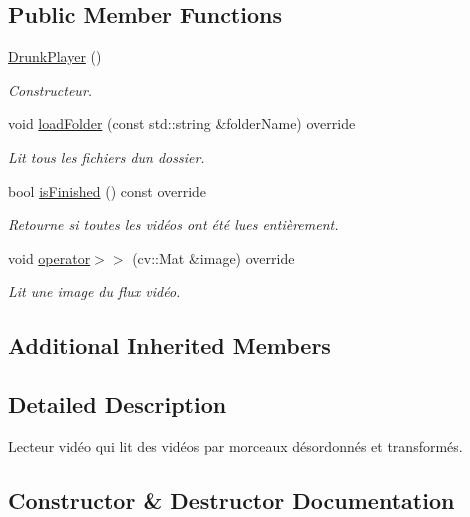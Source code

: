 \subsection*{Public Member Functions}
\begin{DoxyCompactItemize}
\item 
\hyperlink{classDrunkPlayer_a39c64a774a19456f3a4c194ec5e1131f}{Drunk\+Player} ()
\begin{DoxyCompactList}\small\item\em Constructeur. \end{DoxyCompactList}\item 
void \hyperlink{classDrunkPlayer_a235e60ea8a97c4d26277b066c2cebe80}{load\+Folder} (const std\+::string \&folder\+Name) override
\begin{DoxyCompactList}\small\item\em Lit tous les fichiers d\textquotesingle{}un dossier. \end{DoxyCompactList}\item 
bool \hyperlink{classDrunkPlayer_a9c032dda7df01fafc757fb1f4e265bb4}{is\+Finished} () const override
\begin{DoxyCompactList}\small\item\em Retourne si toutes les vidéos ont été lues entièrement. \end{DoxyCompactList}\item 
void \hyperlink{classDrunkPlayer_a2662f5010e15c95ca6639f56f012aed1}{operator$>$$>$} (cv\+::\+Mat \&image) override
\begin{DoxyCompactList}\small\item\em Lit une image du flux vidéo. \end{DoxyCompactList}\end{DoxyCompactItemize}
\subsection*{Additional Inherited Members}


\subsection{Detailed Description}
Lecteur vidéo qui lit des vidéos par morceaux désordonnés et transformés. 

\subsection{Constructor \& Destructor Documentation}
\mbox{\label{classDrunkPlayer_a39c64a774a19456f3a4c194ec5e1131f}} 
